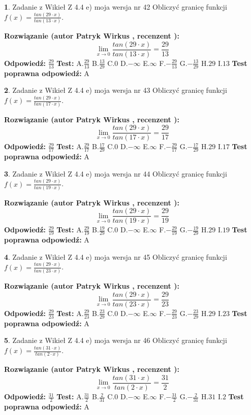 \documentclass[12pt, a4paper]{article}
\theoremstyle{definition} %
\newtheorem{zad}{}
\newcommand{\zadStart}[1]{\begin{zad}#1\newline}
\newcommand{\zadStop}{\end{zad}}
\newcommand{\rozwStart}[2]{\noindent \textbf{Rozwiązanie (autor #1 , recenzent #2): }\newline}
\newcommand{\rozwStop}{\newline}
\newcommand{\odpStart}{\noindent \textbf{Odpowiedź:}\newline}
\newcommand{\odpStop}{\newline}
\newcommand{\testStart}{\noindent \textbf{Test:}\newline}
\newcommand{\testStop}{\newline}
\newcommand{\kluczStart}{\noindent \textbf{Test poprawna odpowiedź:}\newline}
\newcommand{\kluczStop}{\newline}
\begin{document}
\zadStart{Zadanie z Wikieł Z 4.4 e) moja wersja nr 42}
Obliczyć granicę funkcji $f(x)=\frac{tan(29\cdot x)}{tan(13\cdot x)}$.
\zadStop
\rozwStart{Patryk Wirkus}{}
$$\lim\limits_{x\to 0}\frac{tan(29\cdot x)}{tan(13\cdot x)}=
\frac{29}{13}$$
\rozwStop
\odpStart
$\frac{29}{13}$
\odpStop
\testStart
A.$\frac{29}{13}$
B.$\frac{13}{29}$
C.$0$
D.$-\infty$
E.$\infty$
F.$-\frac{29}{13}$
G.$-\frac{13}{29}$
H.$29$
I.$13$
\testStop
\kluczStart
A
\kluczStop



\zadStart{Zadanie z Wikieł Z 4.4 e) moja wersja nr 43}
Obliczyć granicę funkcji $f(x)=\frac{tan(29\cdot x)}{tan(17\cdot x)}$.
\zadStop
\rozwStart{Patryk Wirkus}{}
$$\lim\limits_{x\to 0}\frac{tan(29\cdot x)}{tan(17\cdot x)}=
\frac{29}{17}$$
\rozwStop
\odpStart
$\frac{29}{17}$
\odpStop
\testStart
A.$\frac{29}{17}$
B.$\frac{17}{29}$
C.$0$
D.$-\infty$
E.$\infty$
F.$-\frac{29}{17}$
G.$-\frac{17}{29}$
H.$29$
I.$17$
\testStop
\kluczStart
A
\kluczStop



\zadStart{Zadanie z Wikieł Z 4.4 e) moja wersja nr 44}
Obliczyć granicę funkcji $f(x)=\frac{tan(29\cdot x)}{tan(19\cdot x)}$.
\zadStop
\rozwStart{Patryk Wirkus}{}
$$\lim\limits_{x\to 0}\frac{tan(29\cdot x)}{tan(19\cdot x)}=
\frac{29}{19}$$
\rozwStop
\odpStart
$\frac{29}{19}$
\odpStop
\testStart
A.$\frac{29}{19}$
B.$\frac{19}{29}$
C.$0$
D.$-\infty$
E.$\infty$
F.$-\frac{29}{19}$
G.$-\frac{19}{29}$
H.$29$
I.$19$
\testStop
\kluczStart
A
\kluczStop



\zadStart{Zadanie z Wikieł Z 4.4 e) moja wersja nr 45}
Obliczyć granicę funkcji $f(x)=\frac{tan(29\cdot x)}{tan(23\cdot x)}$.
\zadStop
\rozwStart{Patryk Wirkus}{}
$$\lim\limits_{x\to 0}\frac{tan(29\cdot x)}{tan(23\cdot x)}=
\frac{29}{23}$$
\rozwStop
\odpStart
$\frac{29}{23}$
\odpStop
\testStart
A.$\frac{29}{23}$
B.$\frac{23}{29}$
C.$0$
D.$-\infty$
E.$\infty$
F.$-\frac{29}{23}$
G.$-\frac{23}{29}$
H.$29$
I.$23$
\testStop
\kluczStart
A
\kluczStop



\zadStart{Zadanie z Wikieł Z 4.4 e) moja wersja nr 46}
Obliczyć granicę funkcji $f(x)=\frac{tan(31\cdot x)}{tan(2\cdot x)}$.
\zadStop
\rozwStart{Patryk Wirkus}{}
$$\lim\limits_{x\to 0}\frac{tan(31\cdot x)}{tan(2\cdot x)}=
\frac{31}{2}$$
\rozwStop
\odpStart
$\frac{31}{2}$
\odpStop
\testStart
A.$\frac{31}{2}$
B.$\frac{2}{31}$
C.$0$
D.$-\infty$
E.$\infty$
F.$-\frac{31}{2}$
G.$-\frac{2}{31}$
H.$31$
I.$2$
\testStop
\kluczStart
A
\kluczStop
\end{document}
